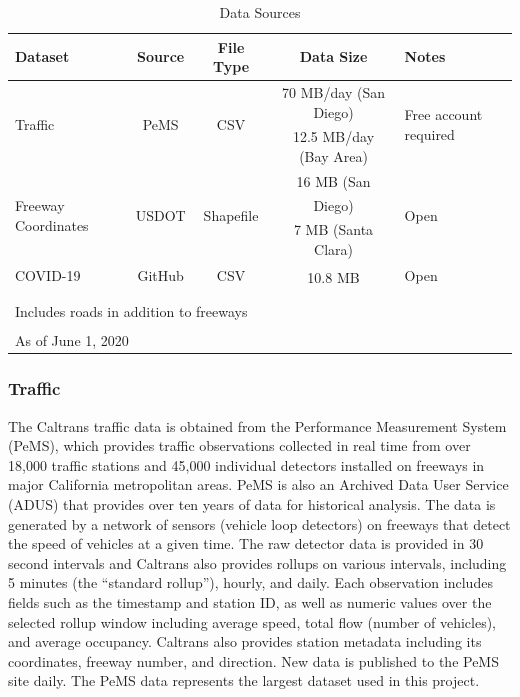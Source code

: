 \documentclass{article}
\begin{document}
\begin{table}[hbt!]
	\caption{Data Sources}
	\centering
	\begin{tabular}{lcccl}
		\toprule
		Dataset & Source & File Type & Data Size & Notes \\
		\midrule
		\multirow{2}{*}{Traffic} & \multirow{2}{*}{PeMS\tablefootnote{\url{https://pems.dot.ca.gov/?dnode=Clearinghouse}}} & \multirow{2}{*}{CSV} & 70 MB/day (San Diego) & \multirow{2}{*}{Free account required} \\ & & & 12.5 MB/day (Bay Area) \\
		\midrule
		\multirow{2}{*}{Freeway Coordinates} & \multirow{2}{*}{USDOT\tablefootnote{\url{https://data-usdot.opendata.arcgis.com/documents/usdot::census-tiger-line-roads/about}}} & \multirow{2}{*}{Shapefile} & 16 MB (San Diego)\textsuperscript{\textasteriskcentered} & \multirow{2}{*}{Open} \\ & & & 7 MB (Santa Clara) \\
		\midrule
		COVID-19 & GitHub\tablefootnote{\url{https://github.com/CSSEGISandData/COVID-19}} & CSV & 10.8 MB\textsuperscript{\textdagger} & Open \\
		\bottomrule \\
		\multicolumn{5}{l}{\textsuperscript{\textasteriskcentered}Includes roads in addition to freeways} \\
		\multicolumn{5}{l}{\textsuperscript{\textdagger}As of June 1, 2020}
	\end{tabular}
	\label{tab:data-sources}
\end{table}

\subsubsection{Traffic}

The Caltrans traffic data is obtained from the Performance Measurement System (PeMS), which provides traffic observations collected in real time from over 18,000 traffic stations and 45,000 individual detectors installed on freeways in major California metropolitan areas. PeMS is also an Archived Data User Service (ADUS) that provides over ten years of data for historical analysis. The data is generated by a network of sensors (vehicle loop detectors) on freeways that detect the speed of vehicles at a given time. The raw detector data is provided in 30 second intervals and Caltrans also provides rollups on various intervals, including 5 minutes (the ``standard rollup''), hourly, and daily. Each observation includes fields such as the timestamp and station ID, as well as numeric values over the selected rollup window including average speed, total flow (number of vehicles), and average occupancy. Caltrans also provides station metadata including its coordinates, freeway number, and direction. New data is published to the PeMS site daily. The PeMS data represents the largest dataset used in this project.
\end{document}
